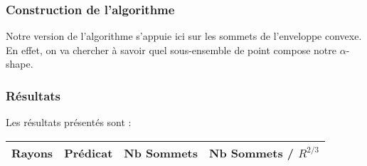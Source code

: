\subsubsection{Construction de l'algorithme}


Notre version de l'algorithme s'appuie ici sur les sommets de l'enveloppe convexe. En effet, on va chercher à savoir quel sous-ensemble de point compose notre $\alpha$-shape.

\subsubsection{Résultats}

Les résultats présentés sont : 

\begin{tabular}{|l|c||c|c|}
\hline
Rayons & Prédicat & Nb Sommets & Nb Sommets / $R^{2/3}$\\
\hline

\hline
\end{tabular} 


